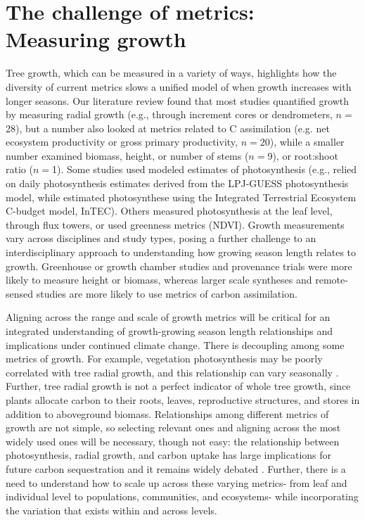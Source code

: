 \documentclass[11pt]{article}
\begin{document}
\section{The challenge of metrics: Measuring growth}

Tree growth, which can be measured in a variety of ways, highlights how the diversity of current metrics slows a unified model of when growth increases with longer seasons. Our literature review found that most studies quantified growth by measuring radial growth (e.g., through increment cores or dendrometers, $n=$28), but a number also looked at metrics related to C assimilation (e.g. net ecosystem productivity or gross primary productivity, $n=$20), while a smaller number examined biomass, height, or number of stems ($n=$9), or root:shoot ratio ($n=$1). Some studies used modeled estimates of photosynthesis 
(e.g., \citet{smith2014implications} relied on daily photosynthesis estimates derived from the LPJ-GUESS photosynthesis model, while \citet{chen2000approaches} estimated photosynthese using the Integrated Terrestrial Ecosystem C-budget model, InTEC). Others measured photosynthesis at the leaf level, through flux towers, or used greenness metrics (NDVI). Growth measurements vary across disciplines and study types, posing a further challenge to an interdisciplinary approach to understanding how growing season length relates to growth. Greenhouse or growth chamber studies and provenance trials were more likely to measure height or biomass, whereas larger scale syntheses and remote-sensed studies are more likely to use metrics of carbon assimilation. 

Aligning across the range and scale of growth metrics will be critical for an integrated understanding of growth-growing season length relationships and implications under continued climate change.  There is decoupling among some metrics of growth. For example, vegetation photosynthesis may be poorly correlated with tree radial growth, and this relationship can vary seasonally \citep{cabon2022cross}. Further, tree radial growth is not a perfect indicator of whole tree growth, since plants allocate carbon to their roots, leaves, reproductive structures, and stores in addition to aboveground biomass. Relationships among different metrics of growth are not simple, so selecting relevant ones and aligning across the most widely used ones will be necessary, though not easy: the relationship  between photosynthesis, radial growth, and carbon uptake has large implications for future carbon sequestration and it remains widely debated \citep{green2022limits}. Further, there is a need to understand how to scale up across these varying metrics- from leaf and individual level to populations, communities, and ecosystems- while incorporating the variation that exists within and across levels.
\end{document}
